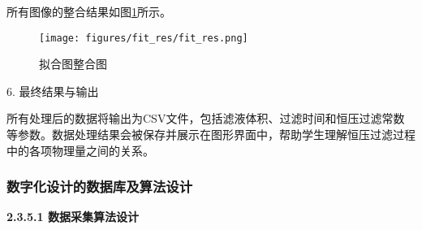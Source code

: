 \documentclass[UTF8,a4paper,fontset=none]{ctexart}
\newcommand{\wuhao}{\fontsize{10.5pt}{15pt}\selectfont}       %
\begin{document}
所有图像的整合结果如图\ref{fig:fit_res_intergrated}所示。

\begin{figure}[H]
    \centering
    \texttt{[image: figures/fit\_res/fit\_res.png]}
    \caption{拟合图整合图}
    \label{fig:fit_res_intergrated}
\end{figure}

\pagebreak{}

6. 最终结果与输出

所有处理后的数据将输出为CSV文件，包括滤液体积、过滤时间和恒压过滤常数等参数。数据处理结果会被保存并展示在图形界面中，帮助学生理解恒压过滤过程中的各项物理量之间的关系。

\subsubsection{数字化设计的数据库及算法设计}

{\noindent \wuhao \rmfamily {} \textbf{2.3.5.1 \quad 数据采集算法设计}}
\end{document}
